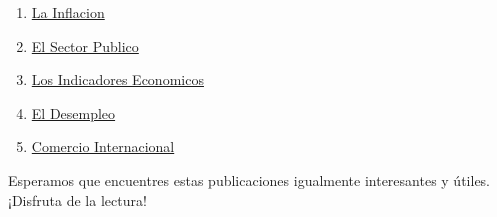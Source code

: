 \documentclass[
  jou,
  floatsintext,
  longtable,
  a4paper,
  nolmodern,
  notxfonts,
  notimes,
  12pt,
  colorlinks=true,linkcolor=blue,citecolor=blue,urlcolor=blue]{apa7}
\begin{document}
\begin{enumerate}
  \href{https://achalmaedison.netlify.app/economia-preuniversitaria/2014-02-25-la-macroeconomia}{La
  Macroeconomia}
\item
  \href{https://achalmaedison.netlify.app/economia-preuniversitaria/2014-03-01-la-inflacion/index.pdf}{}
  \href{https://achalmaedison.netlify.app/economia-preuniversitaria/2014-03-01-la-inflacion}{La
  Inflacion}
\item
  \href{https://achalmaedison.netlify.app/economia-preuniversitaria/2014-03-08-el-sector-publico/index.pdf}{}
  \href{https://achalmaedison.netlify.app/economia-preuniversitaria/2014-03-08-el-sector-publico}{El
  Sector Publico}
\item
  \href{https://achalmaedison.netlify.app/economia-preuniversitaria/2014-03-15-los-indicadores-economicos/index.pdf}{}
  \href{https://achalmaedison.netlify.app/economia-preuniversitaria/2014-03-15-los-indicadores-economicos}{Los
  Indicadores Economicos}
\item
  \href{https://achalmaedison.netlify.app/economia-preuniversitaria/2014-03-22-el-desempleo/index.pdf}{}
  \href{https://achalmaedison.netlify.app/economia-preuniversitaria/2014-03-22-el-desempleo}{El
  Desempleo}
\item
  \href{https://achalmaedison.netlify.app/economia-preuniversitaria/2014-03-29-comercio-internacional/index.pdf}{}
  \href{https://achalmaedison.netlify.app/economia-preuniversitaria/2014-03-29-comercio-internacional}{Comercio
  Internacional}
\end{enumerate}

Esperamos que encuentres estas publicaciones igualmente interesantes y
útiles. ¡Disfruta de la lectura!
\end{document}
